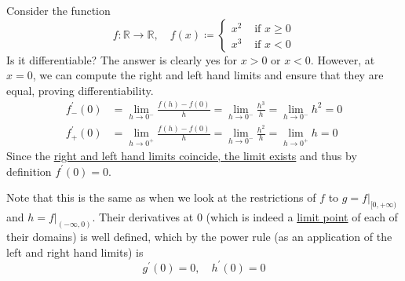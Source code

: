   \begin{example}
    \label{ex:differentiability-of-a-piecewise-definition}
    Consider the function
    \begin{equation}
      f: \mathbb{R} \to \mathbb{R}, \quad f(x) \coloneqq \begin{cases} 
        x^2 & \text{ if } x \geq 0 \\ 
        x^3 & \text{ if } x < 0
      \end{cases}
    \end{equation}
    Is it differentiable? The answer is clearly yes for $x > 0$ or $x < 0$. However, at $x = 0$, we can compute the right and left hand limits and ensure that they are equal, proving differentiability. 
    \begin{align}
      f^\prime_{-} (0) & = \lim_{h \to 0^-} \frac{f(h) - f(0)}{h} = \lim_{h \to 0^-} \frac{h^3}{h} = \lim_{h \to 0^-} h^2 = 0 \\ 
      f^\prime_{+} (0) & = \lim_{h \to 0^+} \frac{f(h) - f(0)}{h} = \lim_{h \to 0^-} \frac{h^2}{h} = \lim_{h \to 0^+} h = 0 
    \end{align}
    Since the \hyperref[thm:two-one-sided]{right and left hand limits coincide, the limit exists} and thus by definition $f^\prime(0) = 0$. 

    Note that this is the same as when we look at the restrictions of $f$ to $g = f |_{[0, +\infty)}$ and $h = f|_{(-\infty, 0)}$. Their derivatives at $0$ (which is indeed a \hyperref[pst-def:limit-point]{limit point} of each of their domains) is well defined, which by the power rule (as an application of the left and right hand limits) is 
    \begin{equation}
      g^\prime (0) = 0, \quad h^\prime (0) = 0
    \end{equation}
  \end{example}

